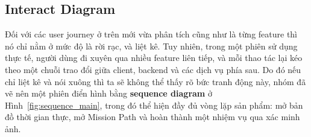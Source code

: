 \subsection{Interact Diagram}
\contrib

Đối với các user journey ở trên mới vừa phân tích cũng như là từng feature thì nó chỉ nằm ở mức độ là
rời rạc, và liệt kê. Tuy nhiên, trong một phiên sử dụng thực tế, người dùng đi xuyên qua nhiều
feature liên tiếp, và mỗi thao tác lại kéo theo một chuỗi trao đổi giữa
client, backend và các dịch vụ phía sau. Do đó nếu chỉ liệt kê và nói xuông thì ta sẽ không thể thấy rõ bức tranh động này,
nhóm đã vẽ nên một phiên điển hình bằng \textbf{sequence diagram} ở
Hình~\ref{fig:sequence_main}, trong đó thể hiện đầy đủ vòng lặp sản phẩm:
mở bản đồ thời gian thực, mở Mission Path và hoàn thành một nhiệm vụ qua
xác minh ảnh.

